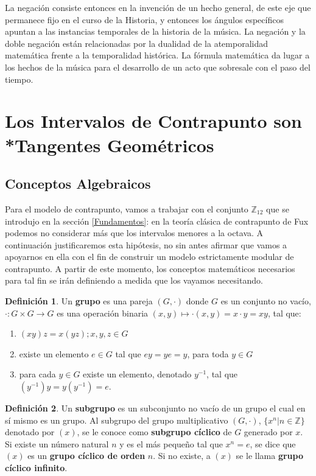 \documentclass[letterpaper,12pt]{book}
\theoremstyle{definition} \newtheorem{Def}{Definición}[chapter]
\theoremstyle{definition} \newtheorem{Teo}{Teorema}[chapter]
\theoremstyle{definition} \newtheorem{Pro}{Proposición}[chapter]
\theoremstyle{definition} \newtheorem{Lema}{Lema}[chapter]
\begin{document}
 La negación consiste entonces en la invención de un hecho general, de este eje que permanece fijo en el curso de la Historia, y entonces los ángulos específicos apuntan a las instancias temporales de la historia de la música. La negación y la doble negación están relacionadas por la dualidad de la atemporalidad matemática frente a la temporalidad histórica. La fórmula matemática da lugar a los hechos de la música para el desarrollo de un acto que sobresale con el paso del tiempo.
 
\section[Los Intervalos de Contrapunto]{Los Intervalos de Contrapunto son \\*Tangentes Geométricos}
 
\subsection{Conceptos Algebraicos}
 
 Para el modelo de contrapunto, vamos a trabajar con el conjunto $\mathbb{Z}_{12}$ que se introdujo en la sección \ref{Fundamentos}: en la teoría clásica de contrapunto de Fux podemos no considerar más que los intervalos menores a la octava. A continuación justificaremos esta hipótesis, no sin antes afirmar que vamos a apoyarnos en ella con el fin de construir un modelo estrictamente modular de contrapunto. A partir de este momento, los conceptos matemáticos necesarios para tal fin se irán definiendo a medida que los vayamos necesitando.
 
\begin{Def} \label{Grupo} 
 Un \textbf{grupo} es una pareja $(G,\cdot)$ donde $G$ es un conjunto no vacío, $\cdot:G \times G \to G$ es una operación binaria $(x,y) \mapsto \cdot (x,y)=x \cdot y = xy$, tal que:
 \begin{enumerate}
  \item $(xy)z=x(yz); x,y,z \in G$
  \item existe un elemento $e \in G$ tal que $ey=ye=y$, para toda $y \in G$  
  \item para cada $y \in G$ existe un elemento, denotado $y^{-1}$, tal que $(y^{-1})y=y(y^{-1})=e$.
 \end{enumerate}
\end{Def}
 
\begin{Def}
 Un \textbf{subgrupo} es un subconjunto no vacío de un grupo el cual en sí mismo es un grupo. Al subgrupo del grupo multiplicativo $(G,\cdot)$, $\{x^n | n \in \mathbb{Z}\}$ denotado por $(x)$, se le conoce como  \textbf{subgrupo cíclico} de $G$ generado por $x$. Si existe un número natural $n$ y es el más pequeño tal que $x^n=e$, se dice que $(x)$ es un \textbf{grupo cíclico de orden} $n$. Si no existe, a $(x)$ se le llama \textbf{grupo cíclico infinito}.
\end{Def}
   
\end{document}
